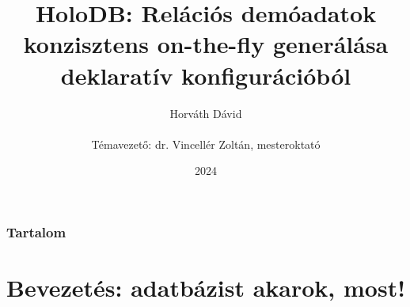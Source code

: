 \documentclass[
    aspectratio=169,
]{beamer}
\title[HoloDB]{HoloDB: Relációs demóadatok konzisztens on-the-fly generálása \\ deklaratív konfigurációból}
\author[Horváth Dávid]{Horváth Dávid \\ ~ \\ { \footnotesize Témavezető: dr. Vincellér Zoltán, mesteroktató }}
\institute[ELTE-IK]{ELTE Informatikai Kar, Információs Rendszerek Tanszék}
\date{2024}
\begin{document}
\beamertemplatenavigationsymbolsempty

\begin{frame}
    \titlepage
\end{frame}

\begin{frame}
    \frametitle{Tartalom}
    \hfill
    \parbox[t]{.95\textwidth}{
        \begin{minipage}[c][0.75\textheight]{\textwidth}
        \tableofcontents
        \end{minipage}
    }
\end{frame}

\section{Bevezetés: adatbázist akarok, most!}
\def\sectionshorttitle{Bevezetés}
\end{document}
